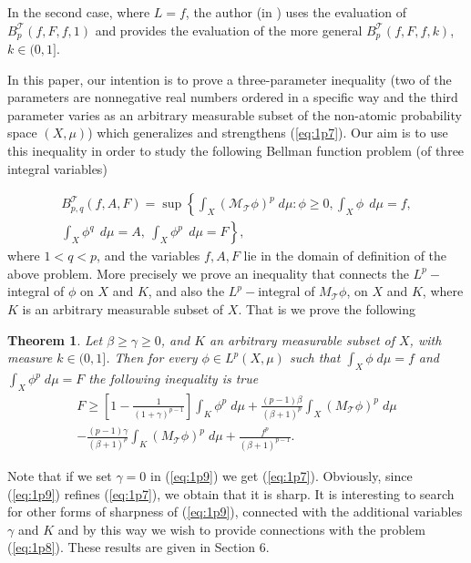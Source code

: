 \documentclass{article}
\numberwithin{equation}{section}
\newtheorem{theorem}{Theorem}[section]
\theoremstyle{definition}
\theoremstyle{remark}
\newcommand{\mr}[1]{\mathrm{#1}}
\newcommand{\mc}[1]{\mathcal{#1}}
\begin{document}
In the second case, where $L=f$, the author (in \cite{M}) uses the evaluation of $B_p^{\mc T}(f,F,f,1)$ and provides the evaluation of the more general $B_p^{\mc T}(f,F,f,k)$, $k\in (0,1]$.

In this paper, our intention is to prove a three-parameter inequality (two of the parameters are nonnegative real numbers ordered in a specific way and the third parameter varies as an arbitrary measurable subset of the non-atomic probability space $(X,\mu)$) which generalizes and strengthens (\ref{eq:1p7}). Our aim is to use this inequality in order to study the following Bellman function problem (of three integral variables)

\begin{multline} \label{eq:1p8}
B_{p,q}^{\mc T}(f,A,F) = \sup \left\{ \int_X \left(\mc M_{\mc T}\phi\right)^p\mr \; d\mu: \phi\geq 0, \int_X\phi\,\mr \; d\mu=f, \right. \\  \left. \int_X\phi^q\,\mr \; d\mu = A,\ \int_X\phi^p\,\mr \; d\mu = F\right\},
\end{multline}
where $1<q<p$, and the variables $f,A,F$ lie in the domain of definition of the above problem. More precisely we prove an inequality that connects the $L^p-$integral of $\phi$ on $X$ and $K$, and also the $L^p-$integral of $M_{\mathcal{T}}\phi$, on $X$ and $K$, where $K$ is an arbitrary measurable subset of $X$. That is we prove the following

\begin{theorem}\label{thm:3p1}
Let $\beta\geq\gamma\geq 0$, and $K$ an arbitrary measurable subset of $X$, with measure $k\in (0,1]$. Then for every $\phi\in L^p(X,\mu)$ such that $\int_X \phi \; d\mu = f$ and $\int_X \phi^p \; d\mu = F$ the following inequality is true
\begin{multline} \label{eq:1p9}
F\geq \left[ 1-\frac{1}{(1+\gamma)^{p-1}} \right] \int_K \phi^p \; d\mu + \frac{(p-1)\beta}{(\beta+1)^p} \int_X (M_{\mathcal{T}}\phi)^p \; d\mu \\ - \frac{(p-1)\gamma}{(\beta+1)^p} \int_K (M_{\mathcal{T}}\phi)^p \; d\mu + \frac{f^p}{(\beta+1)^{p-1}}.
\end{multline}
\end{theorem}

Note that if we set $\gamma=0$ in (\ref{eq:1p9}) we get (\ref{eq:1p7}). Obviously, since (\ref{eq:1p9}) refines (\ref{eq:1p7}), we obtain that it is sharp. It is interesting to search for other forms of sharpness of (\ref{eq:1p9}), connected with the additional variables $\gamma$ and $K$ and by this way we wish to provide connections with the problem (\ref{eq:1p8}). These results are given in Section 6.  
\end{document}
